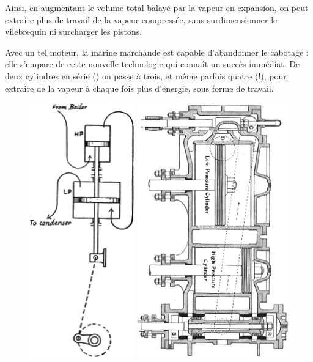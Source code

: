	Ainsi, en augmentant le volume total balayé par la vapeur en expansion, on peut extraire plus de travail de la vapeur compressée, sans surdimensionner le vilebrequin ni surcharger les pistons.

	Avec un tel moteur, la marine marchande est capable d’abandonner le cabotage : elle s’empare de cette nouvelle technologie qui connaît un succès immédiat. De deux cylindres en série () on passe à trois, et même parfois quatre (!), pour extraire de la vapeur à chaque fois plus d’énergie, sous forme de travail.

	\begin{figure}
		\begin{center}
			\includegraphics[height=11cm, max height=0.55\textheight]{images/ripper_compound_1.png}
			\onlyframabook{\hspace{0.5cm}}
			\includegraphics[height=11cm, max height=0.55\textheight]{images/ripper_compound_2.png}

\end{center}
\end{figure}
